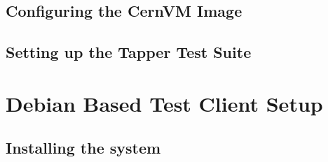 \subsection{Configuring the CernVM Image}
\subsection{Setting up the Tapper Test Suite}


\section{Debian Based Test Client Setup}
\subsection{Installing the system}
\label{sec:debianinstall}
\flushleft
